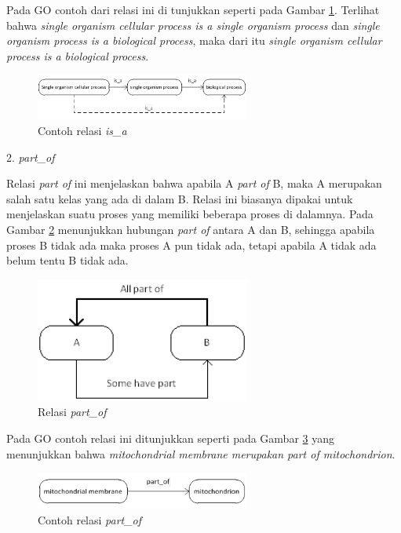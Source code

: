 Pada GO contoh dari relasi ini di tunjukkan seperti pada Gambar \ref{fig:contoh_is_a}. Terlihat bahwa \textit{single organism cellular process is a single organism process} dan \textit{single organism process is a biological process}, maka dari itu \textit{single organism cellular process is a biological process}.

\begin{figure}[h!] %
	\centering
	\includegraphics[width=200pt]{contoh_is_a.png}
	\caption{Contoh relasi \textit{is\_a}}
	\label{fig:contoh_is_a}
\end{figure}
\begin{flushleft}
	2. \textit{part\_of}
\end{flushleft}\par
Relasi \textit{part of}  ini menjelaskan bahwa apabila A \textit{part of} B, maka A merupakan salah satu kelas yang ada di dalam B. Relasi ini biasanya dipakai untuk menjelaskan suatu proses yang memiliki beberapa proses di dalamnya. Pada Gambar \ref{fig:part_of} menunjukkan hubungan \textit{part of} antara A dan B, sehingga apabila proses B tidak ada maka proses A pun tidak ada, tetapi apabila A tidak ada belum tentu B tidak ada.
\begin{figure}[h!] %
	\centering
	\includegraphics[width=200pt]{part_of.png}
	\caption{Relasi \textit{part\_of}}
	\label{fig:part_of}
\end{figure}
\par
Pada GO contoh relasi ini ditunjukkan seperti pada Gambar \ref{fig:contoh_part_of} yang menunjukkan bahwa \textit{mitochondrial membrane merupakan part of mitochondrion}.
\begin{figure}[h!] %
	\centering
	\includegraphics[width=200pt]{contoh_part_of.png}
	\caption{Contoh relasi \textit{part\_of}}
	\label{fig:contoh_part_of}
\end{figure}

